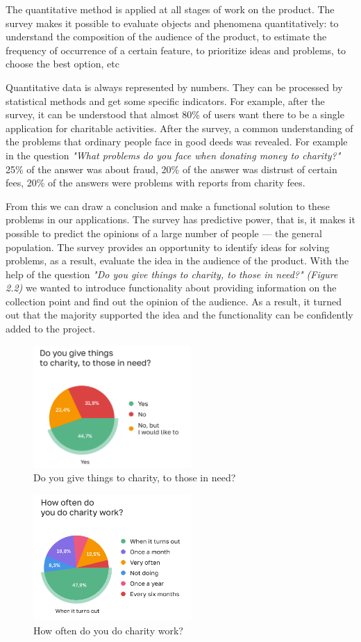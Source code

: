 The quantitative method is applied at all stages of work on the product. The survey makes it possible to evaluate objects and phenomena quantitatively: to understand the composition of the audience of the product, to estimate the frequency of occurrence of a certain feature, to prioritize ideas and problems, to choose the best option, etc

Quantitative data is always represented by numbers. They can be processed by statistical methods and get some specific indicators. For example, after the survey, it can be understood that almost 80\% of users want there to be a single application for charitable activities. After the survey, a common understanding of the problems that ordinary people face in good deeds was revealed. For example in the question \textit{"What problems do you face when donating money to charity?"} 25\% of the answer was about fraud, 20\% of the answer was distrust of certain fees, 20\% of the answers were problems with reports from charity fees. 

From this we can draw a conclusion and make a functional solution to these problems in our applications. The survey has predictive power, that is, it makes it possible to predict the opinions of a large number of people — the general population. The survey provides an opportunity to identify ideas for solving problems, as a result, evaluate the idea in the audience of the product. With the help of the question \textit{"Do you give things to charity, to those in need?" (Figure 2.2)} we wanted to introduce functionality about providing information on the collection point and find out the opinion of the audience. As a result, it turned out that the majority supported the idea and the functionality can be confidently added to the project.

\begin{figure}[h]
    \centering
    \includegraphics[width=6cm]{figures/Questionaire8.png}
    \caption{Do you give things to charity, to those in need?}
    \label{fig:2}
\end{figure}
\begin{figure}[h]
    \centering
    \includegraphics[width=6cm]{figures/Questionaire1.png}
    \caption{How often do you do charity work?}
    \label{fig:3}
\end{figure}

